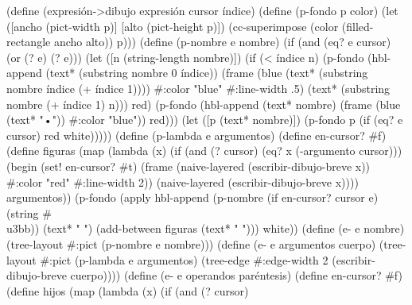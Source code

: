 \documentclass[letterpaper, twoside, openright, 11pt]{book}%
\begin{document}
{(define (expresión->dibujo expresión cursor índice)
  (define (p-fondo p color)
    (let ([ancho (pict-width p)]
          [alto  (pict-height p)])
      (cc-superimpose (color (filled-rectangle ancho alto)) p)))
  (define (p-nombre e nombre)
    (if (and (eq? e cursor) (or (? e) (? e)))
        (let ([n (string-length nombre)])
          (if (< índice n)
              (p-fondo (hbl-append (text* (substring nombre 0 índice))
                                   (frame (blue (text* (substring nombre índice
                                                                  (+ índice 1))))
                                          #:color "blue"
                                          #:line-width .5)
                                   (text* (substring nombre (+ índice 1) n)))
                       red)
              (p-fondo (hbl-append (text* nombre)
                                   (frame (blue (text* "•")) #:color "blue")) red)))
        (let ([p (text* nombre)])
          (p-fondo p (if (eq? e cursor) red white)))))
  (define (p-lambda e argumentos)
    (define en-cursor? #f)
    (define figuras (map (lambda (x)
                           (if (and (? cursor)
                                    (eq? x (-argumento cursor)))
                               (begin
                                 (set! en-cursor? #t)
                                 (frame (naive-layered (escribir-dibujo-breve x))
                                        #:color "red" #:line-width 2))
                               (naive-layered (escribir-dibujo-breve x))))
                         argumentos))
    (p-fondo (apply hbl-append (p-nombre (if en-cursor? cursor e) (string #\\u3bb))   
                    (text* "  ")
                    (add-between figuras (text* "  ")))
             white))
  (define (e- e nombre)
    (tree-layout #:pict (p-nombre e nombre)))
  (define (e- e argumentos cuerpo)
    (tree-layout #:pict (p-lambda e argumentos)
                 (tree-edge #:edge-width 2
                            (escribir-dibujo-breve cuerpo))))
  (define (e- e operandos paréntesis)
    (define en-cursor? #f)
    (define hijos (map (lambda (x)
                         (if (and (? cursor)
}
\end{document}
